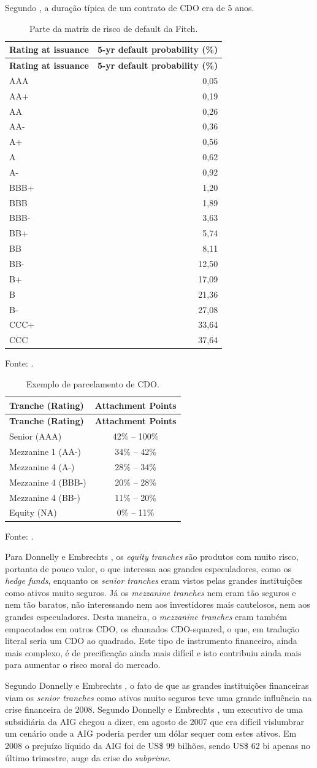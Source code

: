 \documentclass[
	12pt,				%
	oneside,			%
	a4paper,			%
	chapter=TITLE,		%
	section=TITLE,		%
	english,			%
	brazil				%
	]{abntex2}
\begin{document}
Segundo \textcite{watts}, a duração típica de um contrato de \gls{CDO} era de 5 anos.
\begin{longtable}[]{@{}lr@{}}
\caption{Parte da matriz de risco de default da Fitch.}\tabularnewline
\toprule
\textbf{Rating at issuance} & \textbf{5-yr default probability (\%)}\tabularnewline
\midrule
\endfirsthead
\toprule
\textbf{Rating at issuance} & \textbf{5-yr default probability (\%)}\tabularnewline
\midrule
\endhead
AAA & 0,05\tabularnewline
AA+ & 0,19\tabularnewline
AA & 0,26\tabularnewline
AA- & 0,36\tabularnewline
A+ & 0,56\tabularnewline
A & 0,62\tabularnewline
A- & 0,92\tabularnewline
BBB+ & 1,20\tabularnewline
BBB & 1,89\tabularnewline
BBB- & 3,63\tabularnewline
BB+ & 5,74\tabularnewline
BB & 8,11\tabularnewline
BB- & 12,50\tabularnewline
B+ & 17,09\tabularnewline
B & 21,36\tabularnewline
B- & 27,08\tabularnewline
CCC+ & 33,64\tabularnewline
CCC & 37,64\tabularnewline
\bottomrule
\end{longtable}
Fonte: \textcite{watts}.
\begin{longtable}[]{@{}lc@{}}
\caption{Exemplo de parcelamento de \gls{CDO}.}\tabularnewline
\toprule
\textbf{Tranche (Rating)} & \textbf{Attachment Points}\tabularnewline
\midrule
\endfirsthead
\toprule
\textbf{Tranche (Rating)} & \textbf{Attachment Points}\tabularnewline
\midrule
\endhead
Senior (AAA) & 42\% -- 100\%\tabularnewline
Mezzanine 1 (AA-) & 34\% -- 42\%\tabularnewline
Mezzanine 4 (A-) & 28\% -- 34\%\tabularnewline
Mezzanine 4 (BBB-) & 20\% -- 28\%\tabularnewline
Mezzanine 4 (BB-) & 11\% -- 20\%\tabularnewline
Equity (NA) & 0\% -- 11\%\tabularnewline
\bottomrule
\end{longtable}
Fonte: \textcite{watts}.

Para Donnelly e Embrechts \autocite[20]{devil}, os \emph{equity tranches} são produtos com
muito risco, portanto de pouco valor, o que interessa aos grandes especuladores,
como os \emph{hedge funds}, enquanto os \emph{senior tranches} eram vistos pelas grandes
instituições como ativos muito seguros. Já os \emph{mezzanine tranches} nem eram tão
seguros e nem tão baratos, não interessando nem aos investidores mais cautelosos,
nem aos grandes especuladores. Desta maneira, o \emph{mezzanine tranches} eram
também empacotados em outros \gls{CDO}, os chamados \gls{CDO}-squared, o que, em
tradução literal seria um \gls{CDO} ao quadrado. Este tipo de instrumento
financeiro, ainda mais complexo, é de precificação ainda mais difícil e isto
contribuiu ainda mais para aumentar o risco moral do mercado.

Segundo Donnelly e Embrechts \autocite[7]{devil}, o fato de que as grandes instituições
financeiras viam os \emph{senior tranches} como ativos muito seguros teve uma grande
influência na crise financeira de 2008. Segundo Donnelly e Embrechts
\autocite[24]{devil}, um executivo de uma subsidiária da AIG chegou a dizer, em agosto
de 2007 que era difícil vislumbrar um cenário onde a AIG poderia perder um dólar
sequer com estes ativos. Em 2008 o prejuízo líquido da AIG foi de
US\$ 99 bilhões, sendo US\$ 62 bi apenas no último trimestre, auge da crise do
\emph{subprime}.
\end{document}
